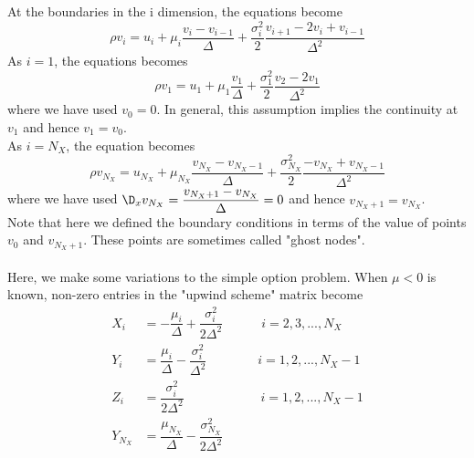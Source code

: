 \documentclass[11pt]{etk-article}
\begin{document}
At the boundaries in the i dimension, the equations become 
\begin{equation}
\rho v_i = u_i + \mu_i \dfrac{v_i-v_{i-1}}{\Delta} + \dfrac{\sigma_i^2}{2} \dfrac{v_{i+1} - 2v_i + v_{i-1}}{\Delta^2}
\end{equation}
As $i =1$, the equations becomes
\begin{equation}
\rho v_1 = u_1 + \mu_1 \dfrac{v_1}{\Delta} + \dfrac{\sigma_1^2}{2} \dfrac{v_{2} - 2v_1}{\Delta^2}
\end{equation}
where we have used $v_0 = 0$. In general, this assumption implies the continuity at $v_1$ and hence $v_1 = v_0$.\\
As $i=N_X$, the equation becomes
\begin{equation}
\rho v_{N_X} = u_{N_X} + \mu_{N_X} \dfrac{v_{N_X}-v_{{N_X}-1}}{\Delta} + \dfrac{\sigma_{N_X}^2}{2} \dfrac{-v_{N_X} + v_{{N_X}-1}}{\Delta^2}
\end{equation}
where we have used $\D_{x} v_{N_X} = \dfrac{v_{N_X+1}-v_{N_X}}{\Delta} = 0$ and hence $v_{N_X+1} = v_{N_X}$. \\
Note that here we defined the boundary conditions in terms of the value of points $v_0$ and $v_{N_X+1}$. These points are sometimes called "ghost nodes". \\
\\
Here, we make some variations to the simple option problem. When $\mu < 0$ is known, non-zero entries in the "upwind scheme" matrix become
\begin{align}
X_i &= -\dfrac{\mu_i}{\Delta} + \dfrac{\sigma_i^2}{2\Delta^2} \qquad \quad  i = 2, 3, ..., N_X \\
Y_i &= \dfrac{\mu_i}{\Delta} - \dfrac{\sigma_i^2}{\Delta^2} \qquad \qquad   i = 1, 2, ..., N_X-1 \\
Z_i &= \dfrac{\sigma_i^2}{2\Delta^2} \qquad  \qquad \qquad i = 1, 2, ..., N_X-1\\
Y_{N_X} & = \dfrac{\mu_{N_X}}{\Delta} - \dfrac{\sigma_{N_X}^2}{2\Delta^2}
\end{align}






\end{document}
